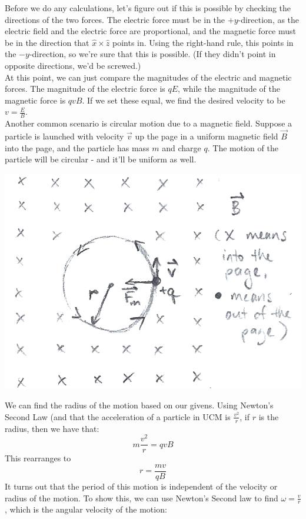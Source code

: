 Before we do any calculations, let's figure out if this is possible by checking the directions of the two forces. The electric force must be in the $+y$-direction, as the electric field and the electric force are proportional, and the magnetic force must be in the direction that $\hat x \times \hat z$ points in. Using the right-hand rule, this points in the $-y$-direction, so we're sure that this is possible. (If they didn't point in opposite directions, we'd be screwed.)\\
At this point, we can just compare the magnitudes of the electric and magnetic forces. The magnitude of the electric force is $qE$, while the magnitude of the magnetic force is $qvB$. If we set these equal, we find the desired velocity to be $v = \frac{E}{B}$. \\
Another common scenario is circular motion due to a magnetic field. Suppose a particle is launched with velocity $\vec v$ up the page in a uniform magnetic field $\vec B$ into the page, and the particle has mass $m$ and charge $q$. The motion of the particle will be circular - and it'll be uniform as well. 
\begin{center}
	\includegraphics[scale=0.25]{images/em/magnetic-circles.png}
\end{center}
We can find the radius of the motion based on our givens. Using Newton's Second Law (and that the acceleration of a particle in UCM is $\frac{v^2}{r}$, if $r$ is the radius, then we have that:
\[
	m\frac{v^2}{r} = qvB
\]
This rearranges to 
\[
	r = \frac{mv}{qB}
\]
It turns out that the period of this motion is independent of the velocity or radius of the motion. To show this, we can use Newton's Second law to find $\omega = \frac{v}{r}$, which is the angular velocity of the motion:
